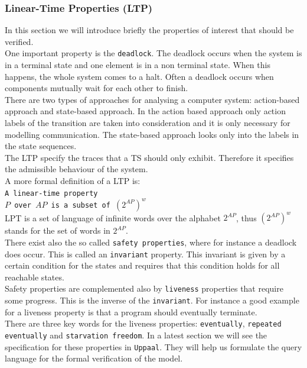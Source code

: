 \documentclass[a4paper, twocolumn]{article}
\begin{document}
\subsubsection{Linear-Time Properties (LTP)}
In this section we will introduce briefly the properties of interest that should be verified.\\
One important property is the \texttt{deadlock}. The deadlock occurs when the system is in a terminal state and one element is in a non terminal state. When this happens, the whole system comes to a halt. Often a deadlock occurs when components mutually wait for each other to finish.\\
There are two types of approaches for analysing a computer system: action-based approach and state-based approach. In the action based approach only action labels of the transition are taken into consideration and it is only necessary for modelling communication. The state-based approach looks only into the labels in the state sequences.\\
The LTP specify the traces that a TS should only exhibit. Therefore it specifies the admissible behaviour of the system.\\
A more formal definition of a LTP is:\\
\colorbox{backcolour}{\texttt{A linear-time property}}\\
\colorbox{backcolour}{\texttt{$P$ over $AP$ is a subset of $(2^{AP})^w$}}\\
LPT is a set of language of infinite words over the alphabet $2^{AP}$, thus $(2^{AP})^w$ stands for the set of words in $2^{AP}$.\\
There exist also the so called \texttt{safety properties}, where for instance a deadlock does occur. This is called an \texttt{invariant} property. This invariant is given by a certain condition for the states and requires that this condition holds for all reachable states.\\
Safety properties are complemented also by \texttt{liveness} properties that require some progress. This is the inverse of the \texttt{invariant}. For instance a good example for a liveness property is that a program should eventually terminate.\\
There are three key words for the liveness properties: \texttt{eventually}, \texttt{repeated eventually} and \texttt{starvation freedom}. In a latest section we will see the specification for these properties in \texttt{Uppaal}. They will help us formulate the query language for the formal verification of the model.
\end{document}
